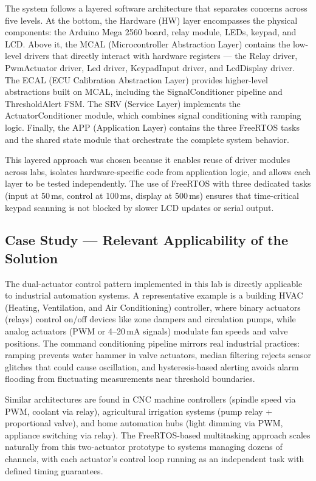 The system follows a layered software architecture that separates concerns across five levels. At the bottom, the Hardware (HW) layer encompasses the physical components: the Arduino Mega 2560 board, relay module, LEDs, keypad, and LCD. Above it, the MCAL (Microcontroller Abstraction Layer) contains the low-level drivers that directly interact with hardware registers --- the Relay driver, PwmActuator driver, Led driver, KeypadInput driver, and LcdDisplay driver. The ECAL (ECU Calibration Abstraction Layer) provides higher-level abstractions built on MCAL, including the SignalConditioner pipeline and ThresholdAlert FSM. The SRV (Service Layer) implements the ActuatorConditioner module, which combines signal conditioning with ramping logic. Finally, the APP (Application Layer) contains the three FreeRTOS tasks and the shared state module that orchestrate the complete system behavior.

This layered approach was chosen because it enables reuse of driver modules across labs, isolates hardware-specific code from application logic, and allows each layer to be tested independently. The use of FreeRTOS with three dedicated tasks (input at 50\,ms, control at 100\,ms, display at 500\,ms) ensures that time-critical keypad scanning is not blocked by slower LCD updates or serial output.

\subsection{Case Study --- Relevant Applicability of the Solution}

The dual-actuator control pattern implemented in this lab is directly applicable to industrial automation systems. A representative example is a building HVAC (Heating, Ventilation, and Air Conditioning) controller, where binary actuators (relays) control on/off devices like zone dampers and circulation pumps, while analog actuators (PWM or 4--20\,mA signals) modulate fan speeds and valve positions. The command conditioning pipeline mirrors real industrial practices: ramping prevents water hammer in valve actuators, median filtering rejects sensor glitches that could cause oscillation, and hysteresis-based alerting avoids alarm flooding from fluctuating measurements near threshold boundaries.

Similar architectures are found in CNC machine controllers (spindle speed via PWM, coolant via relay), agricultural irrigation systems (pump relay + proportional valve), and home automation hubs (light dimming via PWM, appliance switching via relay). The FreeRTOS-based multitasking approach scales naturally from this two-actuator prototype to systems managing dozens of channels, with each actuator's control loop running as an independent task with defined timing guarantees.
